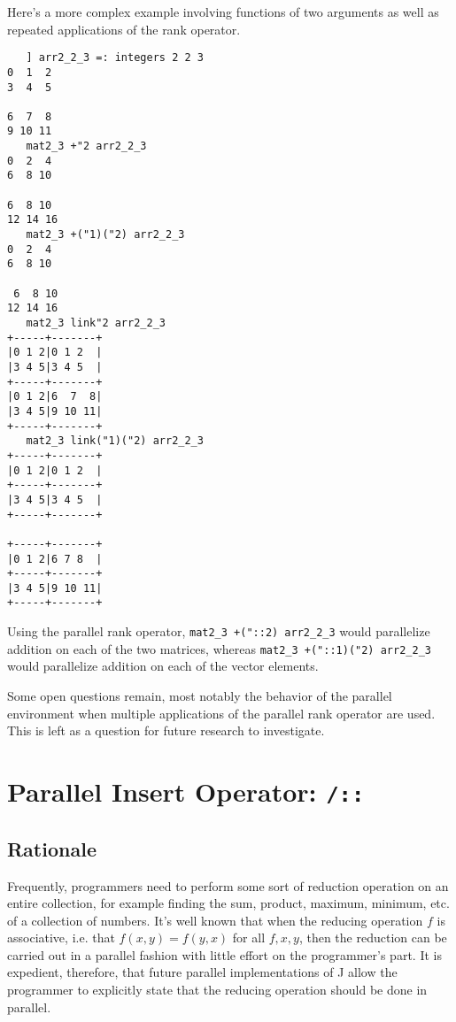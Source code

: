Here's a more complex example involving functions of two arguments 
as well as repeated applications of the rank operator.

\begin{singlespacing}
\begin{small}
\begin{verbatim}
   ] arr2_2_3 =: integers 2 2 3
0  1  2
3  4  5

6  7  8
9 10 11
   mat2_3 +"2 arr2_2_3
0  2  4
6  8 10

6  8 10
12 14 16
   mat2_3 +("1)("2) arr2_2_3
0  2  4
6  8 10

 6  8 10
12 14 16
   mat2_3 link"2 arr2_2_3
+-----+-------+
|0 1 2|0 1 2  |
|3 4 5|3 4 5  |
+-----+-------+
|0 1 2|6  7  8|
|3 4 5|9 10 11|
+-----+-------+
   mat2_3 link("1)("2) arr2_2_3
+-----+-------+
|0 1 2|0 1 2  |
+-----+-------+
|3 4 5|3 4 5  |
+-----+-------+

+-----+-------+
|0 1 2|6 7 8  |
+-----+-------+
|3 4 5|9 10 11|
+-----+-------+
\end{verbatim}
\end{small}
\end{singlespacing}


Using the parallel rank operator, 
\texttt{mat2\_3 +("::2) arr2\_2\_3} would parallelize addition on each of the two matrices, whereas
\texttt{mat2\_3 +("::1)("2) arr2\_2\_3} would parallelize addition on each of the vector elements.

Some open questions remain, most notably 
the behavior of the parallel environment when multiple applications of the parallel rank operator are used. 
This is left as a question for future research to investigate.

\section{Parallel Insert Operator: \texttt{/::}}
\label{pins}
\subsection{Rationale}
Frequently, programmers need to perform some sort of reduction operation on an entire collection, 
for example finding the sum, product, maximum, minimum, etc. of a collection of numbers.
It's well known that when the reducing operation $f$ is associative, i.e. that $f(x,y) = f(y,x)$ for all $f, x, y$, 
then the reduction can be carried out in a parallel fashion with little effort on the programmer's part.
It is expedient, therefore, that future parallel implementations of J allow the programmer 
to explicitly state that the reducing operation should be done in parallel.

